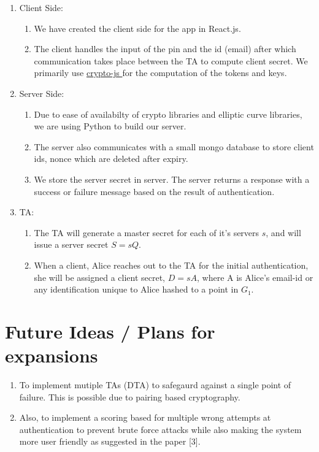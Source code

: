 \documentclass[]{article}   %
\begin{document}
\begin{enumerate}
    \item Client Side:
        \begin{enumerate}
            \item We have created the client side for the app in React.js.
            \item The client handles the input of the pin and the id (email) after which communication takes place between the TA to compute client secret. We primarily use \href{https://www.npmjs.com/package/crypto-js}{ crypto-js } for the computation of the tokens and keys.
        \end{enumerate}
    \item Server Side:
    \begin{enumerate}
        \item Due to ease of availabilty of crypto libraries and elliptic curve libraries, we are using Python to build our server.
        \item The server also communicates with a small mongo database to store client ids, nonce which are deleted after expiry. 
        \item We store the server secret in server. The server returns a response with a success or failure message based on the result of authentication. 
    \end{enumerate}
    \item TA:
    \begin{enumerate}
        \item The TA will generate a master secret for each of it's servers $s$, and will issue a server secret $S = sQ$.

        \item When a client, Alice reaches out to the TA for the initial authentication, she will be assigned a client secret, $D = sA$, where A is Alice's email-id or any identification unique to Alice hashed to a point in $G_1$.
    \end{enumerate}
\end{enumerate}
\newpage
\section*{Future Ideas / Plans for expansions}
\begin{enumerate}
    \item To implement mutiple TAs (DTA) to safegaurd against a single  point of failure. This is possible due to pairing based cryptography.
    \item Also, to implement a scoring based for multiple wrong attempts at authentication to prevent brute force attacks while also making the system more user friendly as suggested in the paper [3]. 
\end{enumerate}


\nocite{*}


\end{document}
